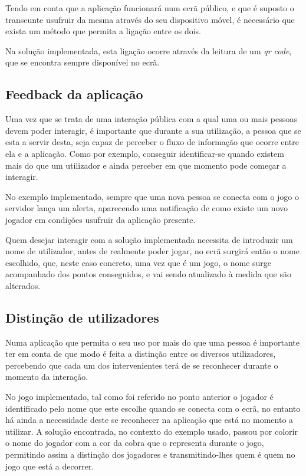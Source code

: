 	Tendo em conta que a aplicação funcionará num ecrã público, e que é suposto o transeunte usufruir da mesma através do seu dispositivo móvel, é necessário que exista um método que permita a ligação entre os dois.

	Na solução implementada, esta ligação ocorre através da leitura de um \textit{qr code}, que se encontra sempre disponível no ecrã.

	\subsection{Feedback da aplicação}

	Uma vez que se trata de uma interação pública com a qual uma ou mais pessoas devem poder interagir, é importante que durante a sua utilização, a pessoa que se esta a servir desta, seja capaz de perceber o fluxo de informação que ocorre entre ela e a aplicação. Como por exemplo, conseguir identificar-se quando existem mais do que um utilizador e ainda perceber em que momento pode começar a interagir.

	No exemplo implementado, sempre que uma nova pessoa se conecta com o jogo o servidor lança um alerta, aparecendo uma notificação de como existe um novo jogador em condições usufruir da aplicação presente. 

	Quem desejar interagir com a solução implementada necessita de introduzir um nome de utilizador, antes de realmente poder jogar, no ecrã surgirá então o nome escolhido, que, neste caso concreto, uma vez que é um jogo, o nome surge acompanhado dos pontos conseguidos, e vai sendo atualizado à medida que são alterados.

	\subsection{Distinção de utilizadores}

	Numa aplicação que permita o seu uso por mais do que uma pessoa é importante ter em conta de que modo é feita a distinção entre os diversos utilizadores, percebendo que cada um dos intervenientes terá de se reconhecer durante o momento da interação. 

	No jogo implementado, tal como foi referido no ponto anterior o jogador é identificado pelo nome que este escolhe quando se conecta com o ecrã, no entanto há ainda a necessidade deste se reconhecer na aplicação que está no momento a utilizar. A solução encontrada, no contexto do exemplo usado, passou por colorir o nome do jogador com a cor da cobra que o representa durante o jogo, permitindo assim a distinção dos jogadores e transmitindo-lhes quem é quem no jogo que está a decorrer.


